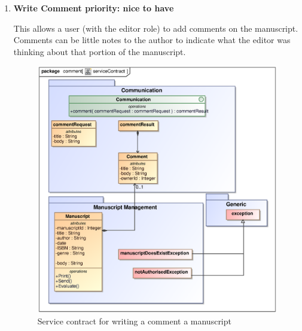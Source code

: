\begin{enumerate}
\newpage

\item \textbf{Write Comment priority: nice to have}\\
\par{This allows a user (with the editor role) to add comments on the manuscript. Comments can be little notes to the author to indicate what the editor was thinking about that portion of the manuscript.}

\begin{figure}[h]
\includegraphics[scale=0.8]{epsImages/Communication/comment.eps}
\caption{Service contract for writing a comment a manuscript}
\end{figure}

\end{enumerate}
